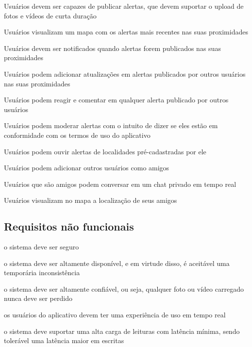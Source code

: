 \begin{alineas}
	\item Usuários devem ser capazes de publicar alertas, que devem suportar o upload de fotos e vídeos de curta duração
 	\item Usuários visualizam um mapa com os alertas mais recentes nas suas proximidades
	\item Usuários devem ser notificados quando alertas forem publicados nas suas proximidades
	\item Usuários podem adicionar atualizações em alertas publicados por outros usuários nas suas proximidades 
	\item Usuários podem reagir e comentar em qualquer alerta publicado por outros usuários
	\item Usuários podem moderar alertas com o intuito de dizer se eles estão em conformidade com os termos de uso do aplicativo
	\item Usuários podem ouvir alertas de localidades pré-cadastradas por ele 
	\item Usuários podem adicionar outros usuários como amigos
	\item Usuários que são amigos podem conversar em um chat privado em tempo real
	\item Usuários visualizam no mapa a localização de seus amigos
\end{alineas}

\subsection{Requisitos não funcionais}
\label{s.requisitos-nao-funcionais}

\begin{alineas}
	\item o sistema deve ser seguro
	\item o sistema deve ser altamente disponível, e em virtude disso, é aceitável uma temporária inconsistência
	\item o sistema deve ser altamente confiável, ou seja, qualquer foto ou vídeo carregado nunca deve ser perdido
	\item os usuários do aplicativo devem ter uma experiência de uso em tempo real
	\item o sistema deve suportar uma alta carga de leituras com latência mínima, sendo tolerável uma latência maior em escritas
\end{alineas}

